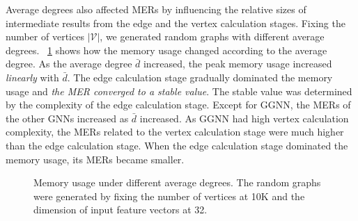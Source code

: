 Average degrees also affected MERs by influencing the relative sizes of intermediate results from the edge and the vertex calculation stages.
%
Fixing the number of vertices $|\mathcal{V}|$, we generated random graphs with different average degrees.
%
\figurename~\ref{fig:exp_memory_expansion_ratio_input_graph_number_of_edges} shows how the memory usage changed according to the average degree.
%
As the average degree $\bar{d}$ increased, the peak memory usage increased \emph{linearly} with $\bar{d}$.
%
The edge calculation stage gradually dominated the memory usage and \emph{the MER converged to a stable value}.
%
The stable value was determined by the complexity of the edge calculation stage.
%
Except for GGNN, the MERs of the other GNNs increased as $\bar{d}$ increased.
%
As GGNN had high vertex calculation complexity, the MERs related to the vertex calculation stage were much higher than the edge calculation stage.
%
When the edge calculation stage dominated the memory usage, its MERs became smaller.

\begin{figure}[H]
    \centering
    \caption{Memory usage under different average degrees. The random graphs were generated by fixing the number of vertices at 10K and the dimension of input feature vectors at 32.}
    \label{fig:exp_memory_expansion_ratio_input_graph_number_of_edges}
\end{figure}

